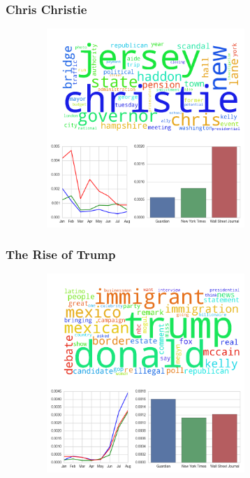 \documentclass[11pt]{beamer}
\begin{document}

\begin{frame}
\frametitle{Chris Christie}

\begin{figure}
\centering
\includegraphics[width=85mm,height=75mm]{figures/source_topic0.png}
\end{figure} 

\end{frame}


\begin{frame}
\frametitle{The Rise of Trump}

\begin{figure}
\centering
\includegraphics[width=85mm,height=75mm]{figures/source_topic10.png}
\end{figure} 

\end{frame}
\end{document}
